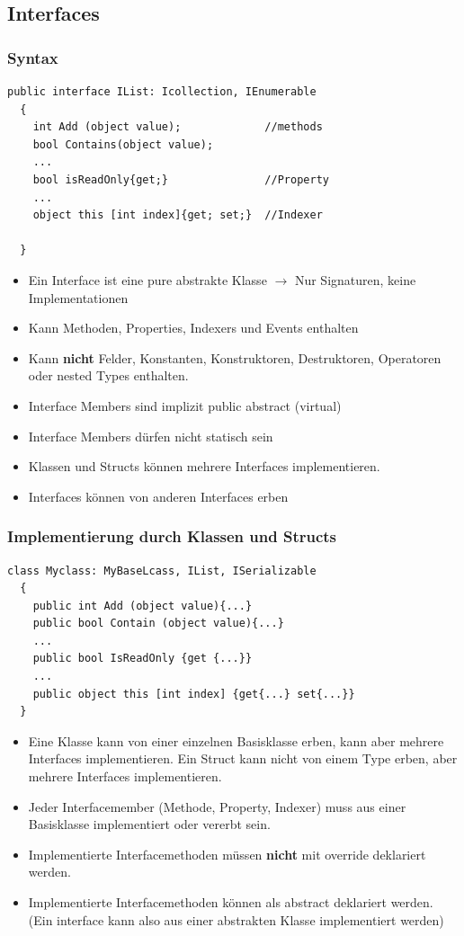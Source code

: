 \subsection{Interfaces}
\subsubsection{Syntax}
\begin{lstlisting}[style=Csharp]
  public interface IList: Icollection, IEnumerable
  {
    int Add (object value);             //methods
    bool Contains(object value);        
    ...
    bool isReadOnly{get;}               //Property
    ...
    object this [int index]{get; set;}  //Indexer
    
  }
\end{lstlisting}
\begin{itemize}
  \item Ein Interface ist eine pure abstrakte Klasse $\rightarrow$ Nur
  Signaturen, keine Implementationen
  \item Kann Methoden, Properties, Indexers und Events enthalten
  \item Kann \textbf{nicht} Felder, Konstanten, Konstruktoren, Destruktoren,
  Operatoren oder nested Types enthalten. 
  \item Interface Members sind implizit public abstract (virtual)
  \item Interface Members dürfen nicht statisch sein
  \item Klassen und Structs können mehrere Interfaces implementieren. 
  \item Interfaces können von anderen Interfaces erben
\end{itemize}

\subsubsection{Implementierung durch Klassen und Structs}
\begin{lstlisting}[style=Csharp]
  class Myclass: MyBaseLcass, IList, ISerializable
  {
    public int Add (object value){...}
    public bool Contain (object value){...}
    ...
    public bool IsReadOnly {get {...}}
    ...
    public object this [int index] {get{...} set{...}}
  }
\end{lstlisting}
\begin{itemize}
\item Eine Klasse kann von einer einzelnen Basisklasse erben, kann aber mehrere
Interfaces implementieren. Ein Struct kann nicht von einem Type erben, aber
mehrere Interfaces implementieren. 
\item Jeder Interfacemember (Methode, Property, Indexer) muss aus einer
Basisklasse implementiert oder vererbt sein. 
\item Implementierte Interfacemethoden müssen \textbf{nicht} mit override
deklariert werden. 
\item Implementierte Interfacemethoden können als abstract deklariert werden.
(Ein interface kann also aus einer abstrakten Klasse implementiert werden)
\end{itemize}

